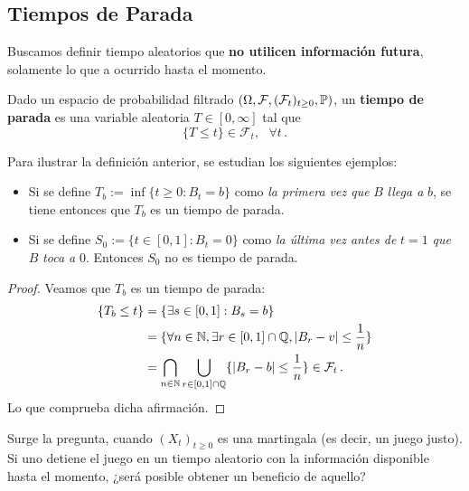\subsection{Tiempos de Parada}
Buscamos definir tiempo aleatorios que \textbf{no utilicen información futura}, solamente lo que a ocurrido hasta el momento.
\begin{definition}
Dado un espacio de probabilidad filtrado $(\Omega, \mathcal{F}, (\mathcal{F}_t)_{t \geq 0}, \P)$, un \textbf{tiempo de parada} es una variable aleatoria $T \in [0, \infty]$ tal que 
\begin{equation*}
    \{ T \leq t \} \in \mathcal{F}_t, ~ ~ ~ \forall  t \,.
\end{equation*}
\end{definition}

\begin{example}
Para ilustrar la definición anterior, se estudian los siguientes ejemplos:
\begin{itemize}
    \item  Si se define $T_b := \inf \{t\geq 0 : B_t =
            b \}$ como \textit{la primera vez que} $B$ \textit{llega a} $b$, se tiene entonces que $T_b$ es un tiempo de parada. 
    \item Si se define $S_0 := \{ t \in [0,1]: B_t = 0 \}$ como \textit{la última vez antes de} $t=1$ \textit{que} $B$ \textit{toca a} $0$. 
            Entonces $S_0$ no es tiempo de parada. 
\end{itemize}
\end{example}
\begin{proof}
\gris
Veamos que $T_b$ es un tiempo de parada:
\begin{align*}
    \{ T_b \leq t \} 
    &= \{\exists s \in [0,1]: B_s = b \} \\
    &= \{\forall n \in \N, \exists r \in [0,1] \cap \mathbb{Q}, \abs{B_r -v} \leq \frac{1}{n}\}\\
    &= \bigcap_{n \in \N} \bigcup_{r \in [0,1] \cap \mathbb{Q}} \{
            \abs{B_r -b} \leq \frac{1}{n} \} \in \mathcal{F}_{t} \,.
\end{align*}
Lo que comprueba dicha afirmación. \findem
\negro
\end{proof}

\newp Surge la pregunta, cuando $(X_t)_{t \geq 0}$ es una martingala (es decir, un juego justo). Si uno detiene 
el juego en un tiempo aleatorio con la información disponible hasta el momento,
¿será posible obtener un beneficio de aquello? 

